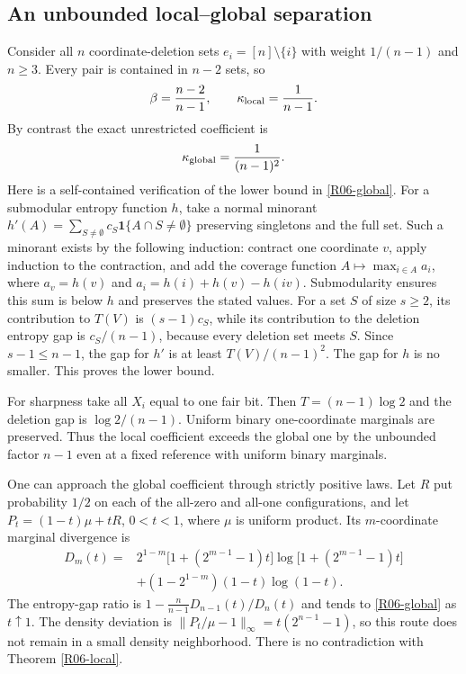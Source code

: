 \documentclass[11pt,a4paper]{article}
\theoremstyle{definition}\newtheorem{definition}[theorem]{Definition}
\theoremstyle{remark}\newtheorem{remark}[theorem]{Remark}
\numberwithin{equation}{section}
\begin{document}
\subsection{An unbounded local--global separation}\label{R06-sec-5}
Consider all $n$ coordinate-deletion sets $e_i=[n]\setminus\{i\}$ with weight $1/(n-1)$ and $n\geq3$. Every pair is contained in $n-2$ sets, so
\[
\beta=\frac{n-2}{n-1},\qquad \kappa_{\rm local}=\frac1{n-1}.
\]
By contrast the exact unrestricted coefficient is
\begin{equation}\label{R06-global}
\kappa_{\rm global}=\frac1{(n-1)^2}.
\end{equation}
Here is a self-contained verification of the lower bound in \eqref{R06-global}. For a submodular entropy function $h$, take a normal minorant
$h'(A)=\sum_{S\ne\emptyset}c_S\mathbf1\{A\cap S\ne\emptyset\}$ preserving singletons and the full set. Such a minorant exists by the following induction: contract one coordinate $v$, apply induction to the contraction, and add the coverage function $A\mapsto\max_{i\in A}a_i$, where $a_v=h(v)$ and $a_i=h(i)+h(v)-h(iv)$. Submodularity ensures this sum is below $h$ and preserves the stated values.
For a set $S$ of size $s\geq2$, its contribution to $T(V)$ is $(s-1)c_S$, while its contribution to the deletion entropy gap is $c_S/(n-1)$, because every deletion set meets $S$. Since $s-1\leq n-1$, the gap for $h'$ is at least $T(V)/(n-1)^2$. The gap for $h$ is no smaller. This proves the lower bound.

For sharpness take all $X_i$ equal to one fair bit. Then $T=(n-1)\log2$ and the deletion gap is $\log2/(n-1)$. Uniform binary one-coordinate marginals are preserved. Thus the local coefficient exceeds the global one by the unbounded factor $n-1$ even at a fixed reference with uniform binary marginals.

One can approach the global coefficient through strictly positive laws. Let $R$ put probability $1/2$ on each of the all-zero and all-one configurations, and let $P_t=(1-t)\mu+tR$, $0<t<1$, where $\mu$ is uniform product. Its $m$-coordinate marginal divergence is
\begin{align*}
D_m(t)={}&2^{1-m}\bigl[1+(2^{m-1}-1)t\bigr]
\log\bigl[1+(2^{m-1}-1)t\bigr]\\
&+(1-2^{1-m})(1-t)\log(1-t).
\end{align*}
The entropy-gap ratio is $1-\frac n{n-1}D_{n-1}(t)/D_n(t)$ and tends to \eqref{R06-global} as $t\uparrow1$. The density deviation is
$\|P_t/\mu-1\|_\infty=t(2^{n-1}-1)$, so this route does not remain in a small density neighborhood. There is no contradiction with Theorem \ref{R06-local}.
\end{document}
